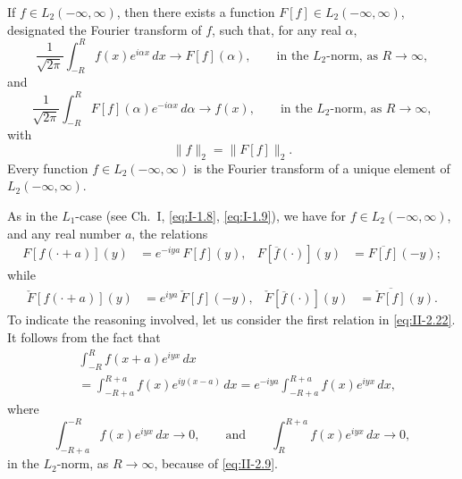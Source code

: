 \begin{theorem}[Plancherel]\label{thm:II-1}
If $f\in L_{2}(-\infty,\infty)$, then there exists a function $F[f]\in L_{2}(-\infty,\infty)$, designated the Fourier transform of $f$, such that, for any real $\alpha$,
\begin{equation}\tag{2.19}\label{eq:II-2.19}
\frac{1}{\sqrt{2\pi}}\int_{-R}^{R}f(x)e^{i\alpha x}\,dx\to F[f](\alpha),\qquad\text{in the $L_{2}$-norm, as $R\to\infty$},
\end{equation}
and
\begin{equation}\tag{2.20}\label{eq:II-2.20}
\frac{1}{\sqrt{2\pi}}\int_{-R}^{R}F[f](\alpha)e^{-i\alpha x}\,d\alpha\to f(x),\qquad\text{in the $L_{2}$-norm, as $R\to\infty$},
\end{equation}
with
\begin{equation}\tag{2.21}\label{eq:II-2.21}
\|f\|_{2}=\|F[f]\|_{2}.
\end{equation}
Every function $f\in L_{2}(-\infty,\infty)$ is the Fourier transform of a unique element of $L_{2}(-\infty,\infty)$.
\end{theorem}

As in the $L_{1}$-case (see Ch.~I, \eqref{eq:I-1.8}, \eqref{eq:I-1.9}), we have for $f\in L_{2}(-\infty,\infty)$, and any real number $a$, the relations
\begin{align}\tag{2.22}\label{eq:II-2.22}
F[f(\cdot+a)](y)&=e^{-iya}\,F[f](y), & F[\overline{f}(\cdot)](y)&=\overline{F[f]}(-y);
\end{align}
while
\begin{align}\tag{2.23}\label{eq:II-2.23}
\check F[f(\cdot+a)](y)&=e^{iya}\,\check F[f](-y), & \check F[\overline{f}(\cdot)](y)&=\overline{\check F[f]}(y).
\end{align}
To indicate the reasoning involved, let us consider the first relation in \eqref{eq:II-2.22}. It follows from the fact that
\[
\begin{aligned}
&\int_{-R}^{R}f(x+a)e^{iyx}\,dx\\
&= \int_{-R+a}^{R+a}f(x)e^{iy(x-a)}\,dx = e^{-iya}  \int_{-R+a}^{R+a}f(x)e^{iyx}\,dx,
\end{aligned}
\]
where
\[
\int_{-R+a}^{-R}f(x)e^{iyx}\,dx\to 0,\qquad\text{and}\qquad
\int_{R}^{R+a}f(x)e^{iyx}\,dx\to 0,
\]
in the $L_{2}$-norm, as $R\to\infty$, because of \eqref{eq:II-2.9}.

